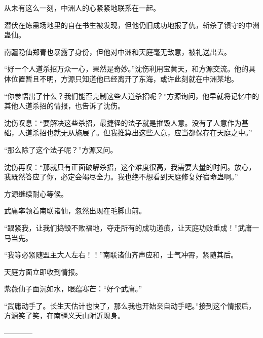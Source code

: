 \begin{this_body}
从未有这么一刻，中洲人的心紧紧地联系在一起。

潜伏在炼蛊场地里的自在书生被发现，但他仍旧成功地报了仇，斩杀了镇守的中洲蛊仙。

南疆隐仙郑青也暴露了身份，但他对中洲和天庭毫无敌意，被礼送出去。

“好一个人道杀招万众一心，果然是奇妙。”沈伤利用宝黄天，和方源交流。他的具体位置暂且不明，方源只知道他已经离开了东海，或许此刻就在中洲某地。

“你参悟出了什么？我们能否克制这些人道杀招呢？”方源询问，他早就将记忆中的其他人道杀招的情报，也告诉了沈伤。

沈伤叹息：“要解决这些杀招，最捷径的法子就是摧毁人意。没有了人意作为基础，人道杀招也就无从施展了。但我推算出这些人意，应当都保存在天庭之中。”

“那么除了这个法子呢？”方源又问。

沈伤再叹：“那就只有正面破解杀招，这个难度很高，我需要大量的时间。放心，我既然答应了你，必定会竭尽全力。我也绝不想看到天庭修复好宿命蛊啊。”

方源继续耐心等候。

武庸率领着南联诸仙，忽然出现在毛脚山前。

“跟紧我，让我们捣毁不败福地，夺走所有的成功道痕，让天庭功败垂成！”武庸一马当先。

“我等必紧随盟主大人左右！！”南联诸仙齐声应和，士气冲霄，紧随其后。

天庭方面立即收到情报。

紫薇仙子面沉如水，眼蕴寒芒：“好个武庸。”

“武庸动手了。长生天估计也快了，那么我也开始亲自动手吧。”接到这个情报后，方源笑了笑，在南疆义天山附近现身。

------------

\end{this_body}

